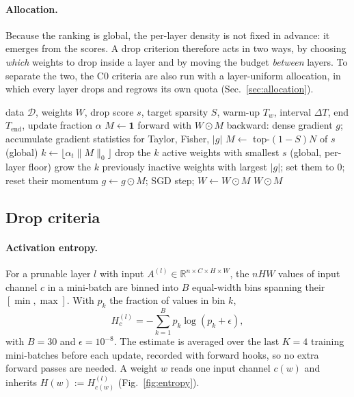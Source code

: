 \paragraph{Allocation.} Because the ranking is global, the per-layer density is not fixed in advance: it emerges from the scores. A drop criterion therefore acts in two ways, by choosing \emph{which} weights to drop inside a layer and by moving the budget \emph{between} layers. To separate the two, the C0 criteria are also run with a layer-uniform allocation, in which every layer drops and regrows its own quota (Sec.~\ref{sec:allocation}).

\begin{algorithm}
\caption{Prune-and-regrow loop; only the drop score $s$ differs between runs}
\label{alg:loop}
\begin{algorithmic}[1]
\Require data $\mathcal{D}$, weights $W$, drop score $s$, target sparsity $S$, warm-up $T_w$, interval $\Delta T$, end $T_{\text{end}}$, update fraction $\alpha$
\State $M \gets \mathbf{1}$
\State forward with $W\odot M$ 
\State backward: dense gradient $g$; accumulate gradient statistics for Taylor, Fisher, $|g|$
\State $M \gets$ top-$(1-S)N$ of $s$ (global)
\State $k \gets \lfloor \alpha_t \|M\|_0 \rfloor$ 
\State drop the $k$ active weights with smallest $s$ (global, per-layer floor)
\State grow the $k$ previously inactive weights with largest $|g|$; set them to $0$; reset their momentum
\EndIf
\State $g \gets g \odot M$; SGD step; $W \gets W\odot M$
\EndFor
\State \Return $W\odot M$
\end{algorithmic}
\end{algorithm}

\subsection{Drop criteria}
\label{sec:criteria-def}

\paragraph{Activation entropy.} For a prunable layer $l$ with input $A^{(l)}\in\mathbb{R}^{n\times C\times H\times W}$, the $nHW$ values of input channel $c$ in a mini-batch are binned into $B$ equal-width bins spanning their $[\min,\max]$. With $p_k$ the fraction of values in bin $k$,
\begin{equation}
H^{(l)}_c = -\sum_{k=1}^{B} p_k \log (p_k + \epsilon),
\label{eq:entropy}
\end{equation}
with $B=30$ and $\epsilon=10^{-8}$. The estimate is averaged over the last $K=4$ training mini-batches before each update, recorded with forward hooks, so no extra forward passes are needed. A weight $w$ reads one input channel $c(w)$ and inherits $H(w) := H^{(l)}_{c(w)}$ (Fig.~\ref{fig:entropy}).

